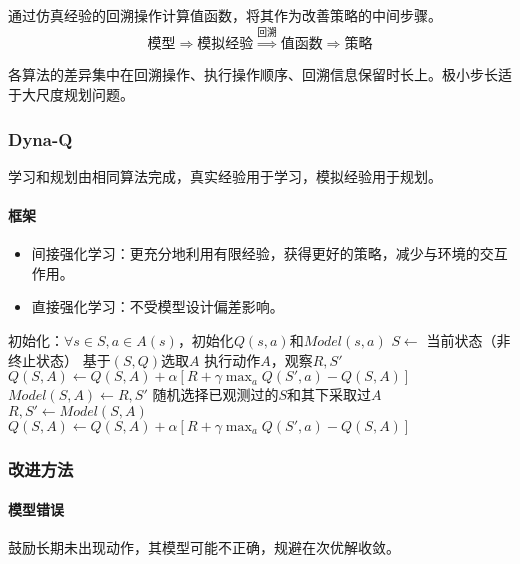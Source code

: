 \documentclass[
12pt, %
a4paper, 
oneside, %
headinclude,footinclude, %
]{scrartcl}
\begin{document}
通过仿真经验的回溯操作计算值函数，将其作为改善策略的中间步骤。
$$ \text{模型} \Longrightarrow \text{模拟经验} \overset{\text{回溯}}{\Longrightarrow} \text{值函数} \Longrightarrow \text{策略} $$

各算法的差异集中在回溯操作、执行操作顺序、回溯信息保留时长上。极小步长适于大尺度规划问题。
\subsubsection[Dyna-Q]{Dyna-Q}
学习和规划由相同算法完成，真实经验用于学习，模拟经验用于规划。
\paragraph{框架}
\begin{itemize}
\item 间接强化学习：更充分地利用有限经验，获得更好的策略，减少与环境的交互作用。
\item 直接强化学习：不受模型设计偏差影响。
\end{itemize}
\begin{myalgorithm}[表格型Dyna-Q]
\State 初始化：$ \forall s \in S, a \in A(s) $，初始化$ Q(s, a) $和$ Model(s, a) $
\Loop
\State $ S \gets $ 当前状态（非终止状态）
\State 基于$ (S, Q) $选取$ A $ 
\State 执行动作$ A $，观察$ R,S' $
\State $ Q(S, A) \gets Q(S, A) + \alpha[R + \gamma \max_a Q(S', a) - Q(S, A)] $ 
\State $ Model(S, A) \gets R,S' $
 
\State 随机选择已观测过的$ S $和其下采取过$ A $
\State $ R,S' \gets Model(S, A) $ 
\State $ Q(S, A) \gets Q(S, A) + \alpha[R + \gamma \max_a Q(S', a) - Q(S, A)] $ 
\EndFor
\EndLoop
\end{myalgorithm}
\subsubsection[改进方法]{改进方法}
\paragraph{模型错误}
鼓励长期未出现动作，其模型可能不正确，规避在次优解收敛。
\end{document}
